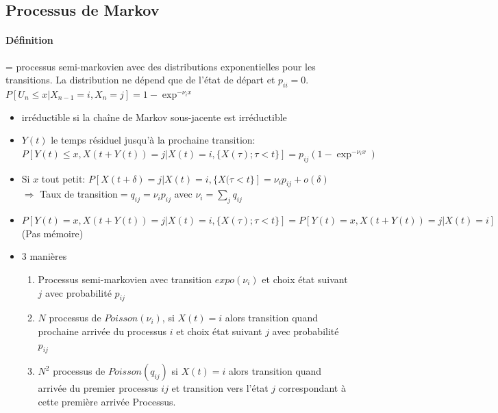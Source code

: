 \documentclass[paper=a4,fontsize=8pt,pagesize,DIV=calc]{scrartcl}
\newcounter{row}
\begin{document}
\begin{multicols}{3}
\section{Processus de Markov}
\paragraph{Définition} = processus semi-markovien avec des distributions exponentielles pour les transitions.
La distribution ne dépend que de l'état de départ et $p_{ii} = 0$. $P[U_n\leq  x|X_{n-1} = i,X_n = j] = 1 -\exp^{-\nu_ix}$
\begin{itemize}
\item irréductible si la chaîne de Markov sous-jacente est irréductible
\item $Y (t)$ le temps résiduel jusqu’à la prochaine transition:
\\ $P[Y (t)\leq x,X(t+Y (t)) = j|X(t) = i, \{X(\tau );\tau < t\}] = p_{ij}(1-\exp^{-\nu_ix})$
\item Si $x$ tout petit:
$P[X(t + \delta) = j|X(t) = i, \{X(\tau <t\}] = \nu_i p_{ij}+o(\delta)$
\\$\Rightarrow$ Taux de transition$= q_{ij} = \nu_i p_{ij}$ avec
 $\nu_i= \sum_j q_{ij}$
 \item $P[Y (t)= x,X(t+Y (t)) = j|X(t) = i, \{X(\tau );\tau < t\}] =P[Y (t)= x,X(t+Y (t)) = j|X(t) = i] $ (Pas mémoire)
 \item 3 manières
 \begin{enumerate}
 \item Processus semi-markovien avec transition $expo(\nu_i)$ et choix état suivant $j$ avec probabilité $p_{ij}$
 \item $N$ processus de $Poisson(\nu_i)$, si $X(t) = i$ alors transition quand prochaine arrivée du processus $i$ et choix état
suivant $j$ avec probabilité $p_{ij}$
\item $N^2$ processus de $Poisson(q_{ij})$ si $X(t) = i$ alors transition quand arrivée du premier processus $ij$ et transition vers
l’état $j$ correspondant à cette première arrivée Processus.
 \end{enumerate}
 \end{itemize}

\end{multicols}
\end{document}
